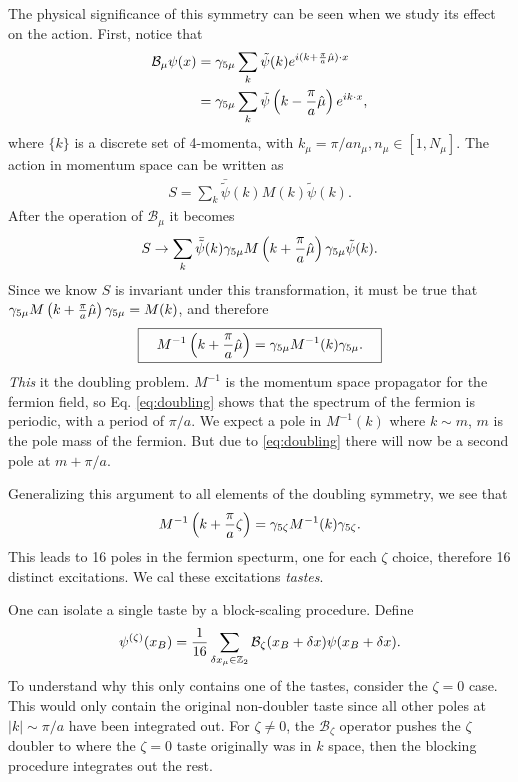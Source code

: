 The physical significance of this symmetry can be seen when we study its effect on the action. First, notice that
\begin{align}
  \mathcal{B}_{\mu} \psi(x) & = \gamma_{5\mu} \sum_k \tilde{\psi}(k) e^{i(k+{\pi\over a}\hat{\mu})\cdot x} \\
  & = \gamma_{5\mu} \sum_k \tilde{\psi}\left(k-{\pi\over a}\hat{\mu}\right)e^{ik\cdot x},
\end{align}
where $\{k\}$ is a discrete set of 4-momenta, with $k_{\mu}=\pi/an_{\mu}, n_{\mu}\in[1,N_{\mu}]$. The action in momentum space can be written as
\begin{align}
  S = \sum_k \bar{\tilde{\psi}}(k) M(k) \tilde{\psi}(k).
\end{align}
After the operation of $\mathcal{B}_{\mu}$ it becomes
\begin{align}
  S \to \sum_k \bar{\tilde{\psi}}(k) \gamma_{5\mu} M\left(k+{\pi\over a}\hat{\mu}\right)\gamma_{5\mu} \tilde{\psi}(k).
\end{align}
Since we know $S$ is invariant under this transformation, it must be true that $\gamma_{5\mu} M\left(k+{\pi\over a}\hat{\mu}\right)\gamma_{5\mu} = M(k)$, and therefore
\begin{align}
  \boxed{  \quad M^{-1}\left(k+{\pi\over a}\hat{\mu}\right) = \gamma_{5\mu} M^{-1}(k) \gamma_{5\mu}. \quad}
  \label{eq:doubling}
\end{align}
    {\it{This}} it the doubling problem. $M^{-1}$ is the momentum space propagator for the fermion field, so Eq. \eqref{eq:doubling} shows that the spectrum of the fermion is periodic, with a period of $\pi/a$. We expect a pole in $M^{-1}(k)$ where $k \sim m$, $m$ is the pole mass of the fermion. But due to \eqref{eq:doubling} there will now be a second pole at $m + \pi/a$. %

    Generalizing this argument to all elements of the doubling symmetry, we see that
    \begin{align}
      M^{-1}\left(k+{\pi\over a}\zeta\right) = \gamma_{5\zeta} M^{-1}(k) \gamma_{5\zeta}.
    \end{align}
    This leads to 16 poles in the fermion specturm, one for each $\zeta$ choice, therefore 16 distinct excitations. We cal these excitations \textit{tastes}.

    One can isolate a single taste by a block-scaling procedure. Define
    \begin{align}
      \psi^{(\zeta)}(x_B) = {1\over 16} \sum_{\delta x_{\mu} \in \mathbb{Z}_2} \mathcal{B}_{\zeta}(x_B + \delta x) \psi(x_B + \delta x).
      \label{eq:block-scaling}
    \end{align}
To understand why this only contains one of the tastes, consider the $\zeta = 0$ case. This would only contain the original non-doubler taste since all other poles at $|k|\sim\pi/a$ have been integrated out. For $\zeta \neq 0$, the $\mathcal{B}_{\zeta}$ operator pushes the $\zeta$ doubler to where the $\zeta=0$ taste originally was in $k$ space, then the blocking procedure integrates out the rest.


